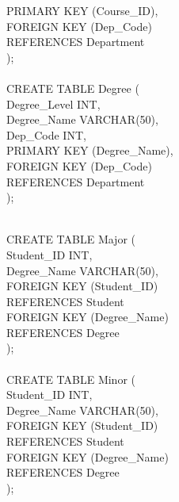 \documentclass[12pt]{article}
\newenvironment{PTMono}{\fontfamily{PTMono-TLF}\selectfont}{\par}
\begin{document}
\begin{multicols}{2}
\begin{PTMono}
  PRIMARY KEY (Course\_ID),\\
\indent   FOREIGN KEY (Dep\_Code) \\
\indent \indent REFERENCES Department\\
);\\\\



\noindent CREATE TABLE Degree (\\
\indent  Degree\_Level INT,\\
\indent  Degree\_Name VARCHAR(50),\\
\indent  Dep\_Code INT,\\

  PRIMARY KEY (Degree\_Name),\\
\indent   FOREIGN KEY (Dep\_Code) \\
\indent \indent REFERENCES Department\\
);\\\\



\columnbreak


\noindent CREATE TABLE Major (\\
\indent  Student\_ID INT,\\
\indent  Degree\_Name VARCHAR(50),\\

FOREIGN KEY (Student\_ID) \\
\indent \indent REFERENCES Student\\
\indent   FOREIGN KEY (Degree\_Name) \\
\indent \indent REFERENCES Degree\\
);\\\\



\noindent CREATE TABLE Minor (\\
\indent  Student\_ID INT,\\
\indent  Degree\_Name VARCHAR(50),\\

FOREIGN KEY (Student\_ID) \\
\indent \indent REFERENCES Student\\
\indent   FOREIGN KEY (Degree\_Name) \\
\indent \indent REFERENCES Degree\\
);\\\\




\end{PTMono}
\end{multicols}
\end{document}
